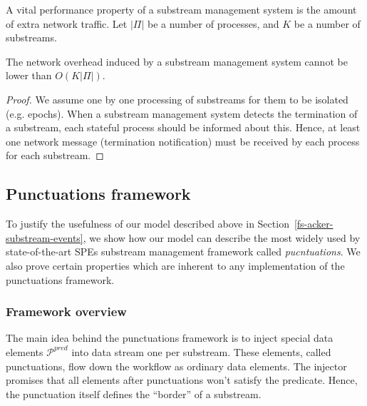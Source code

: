 A vital performance property of a substream management system is the amount of extra network traffic. Let $|\Pi|$ be a number of processes, and $K$ be a number of substreams. 

\begin{lemma}
The network overhead induced by a substream management system cannot be lower than $O(K|\Pi|)$. 
\end{lemma}
\begin{proof}
We assume one by one processing of substreams for them to be isolated (e.g. epochs). When a substream management system detects the termination of a substream, each stateful process should be informed about this. Hence, at least one network message (termination notification) must be received by each process for each substream.
\end{proof}


\subsection{Punctuations framework}
\label{fs-acker-punctuations}

To justify the usefulness of our model described above in Section~\ref{fs-acker-substream-events}, we show how our model can describe the most widely used by state-of-the-art SPEs substream management framework called {\em pucntuations}. We also prove certain properties which are inherent to any implementation of the punctuations framework. 

\subsubsection{Framework overview}

The main idea behind the punctuations framework is to inject special data elements $\mathcal{P}^{pred}$ into data stream one per substream. These elements, called punctuations, flow down the workflow as ordinary data elements. The injector promises that all elements after punctuations won't satisfy the predicate. Hence, the punctuation itself defines the ``border'' of a substream.

